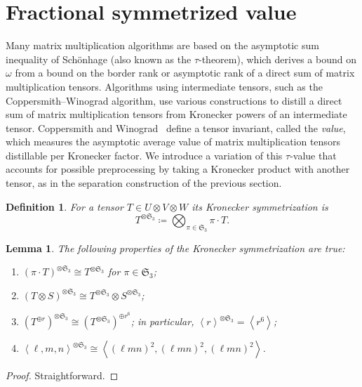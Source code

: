 \documentclass[11pt,letterpaper]{article}
\newtheorem{definition}[theorem]{Definition}\AddToHook{env/definition/begin}{\crefalias{theorem}{definition}}
\newtheorem{lemma}[theorem]{Lemma}\AddToHook{env/lemma/begin}{\crefalias{theorem}{lemma}}
\numberwithin{equation}{section}
\begin{document}
\section{Fractional symmetrized value}
\label{sec:value}
Many matrix multiplication algorithms are based on the asymptotic sum inequality of Sch\"onhage (also known as the
$\tau$-theorem), which derives a bound on $\omega$ from a bound on the border rank or asymptotic rank of a direct sum of
matrix multiplication tensors.
Algorithms using intermediate tensors, such as the Coppersmith--Winograd algorithm, use various constructions to
distill a direct sum of matrix multiplication tensors from Kronecker powers of an intermediate tensor.
Coppersmith and Winograd~\cite{CW-90} define a tensor invariant, called the \emph{value}, which measures the asymptotic average value of matrix multiplication tensors distillable per Kronecker factor.
We introduce a variation of this $\tau$-value that accounts for possible preprocessing by taking a Kronecker product with
another tensor, as in the separation construction of the previous section.


\begin{definition}\label{def:symmetrization}
    For a tensor $T \in U \otimes V \otimes W$ its \emph{Kronecker symmetrization} is \[
    T^{\otimes \mathfrak{S}_3}\coloneqq \bigotimes_{\pi \in \mathfrak{S}_3} \pi \cdot T.\]
\end{definition}

\begin{lemma}\label{lem:sym-properties}
The following properties of the Kronecker symmetrization are true:
\begin{enumerate}
\item $(\pi \cdot T)^{\otimes \mathfrak{S}_3} \cong T^{\otimes \mathfrak{S}_3}$ for $\pi \in \mathfrak{S}_3$;
\item $(T \otimes S)^{\otimes \mathfrak{S}_3} \cong T^{\otimes \mathfrak{S}_3} \otimes S^{\otimes \mathfrak{S}_3}$;
\item $(T^{\oplus r})^{\otimes \mathfrak{S}_3} \cong \left(T^{\otimes \mathfrak{S}_3}\right)^{\oplus r^6}$; in
  particular, $\left<r\right>^{\otimes \mathfrak{S}_3} = \left<r^6\right>$;
\item $\left<\ell, m, n\right>^{\otimes \mathfrak{S}_3} \cong \left<(\ell mn)^2, (\ell mn)^2, (\ell mn)^2\right>$.
\end{enumerate}
\end{lemma}

\begin{proof}
    Straightforward.
\end{proof}
\end{document}

